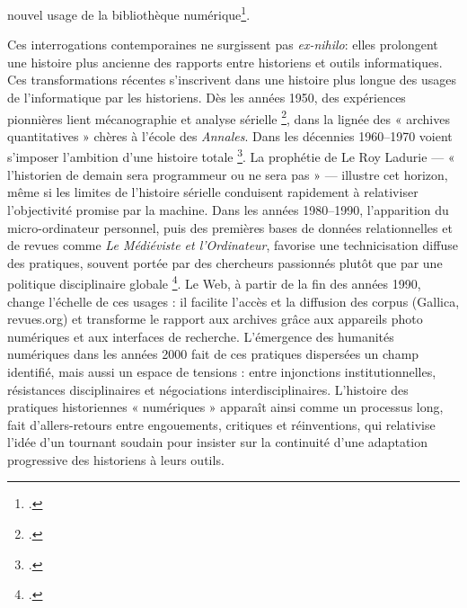 nouvel usage de la bibliothèque numérique\footcite[][]{bequet}.

Ces interrogations contemporaines ne surgissent pas \emph{ex-nihilo}: elles prolongent une histoire plus ancienne des rapports entre historiens et outils informatiques. Ces transformations récentes s’inscrivent dans une histoire plus longue des usages de l’informatique par les historiens. Dès les années 1950, des expériences pionnières lient mécanographie et analyse sérielle \footcite[][]{daumard}, dans la lignée des « archives quantitatives » chères à l’école des \emph{Annales}. Dans les décennies 1960–1970 voient s’imposer l’ambition d’une histoire totale \footcite[][]{poublanc}. La prophétie de Le Roy Ladurie — « l’historien de demain sera programmeur ou ne sera pas » — illustre cet horizon, même si les limites de l’histoire sérielle conduisent rapidement à relativiser l’objectivité promise par la machine. Dans les années 1980–1990, l’apparition du micro-ordinateur personnel, puis des premières bases de données relationnelles et de revues comme \emph{Le Médiéviste et l’Ordinateur}, favorise une technicisation diffuse des pratiques, souvent portée par des chercheurs passionnés plutôt que par une politique disciplinaire globale \footcite[][]{poublanc}. Le Web, à partir de la fin des années 1990, change l’échelle de ces usages : il facilite l’accès et la diffusion des corpus (Gallica, revues.org) et transforme le rapport aux archives grâce aux appareils photo numériques et aux interfaces de recherche. L’émergence des humanités numériques dans les années 2000 fait de ces pratiques dispersées un champ identifié, mais aussi un espace de tensions : entre injonctions institutionnelles, résistances disciplinaires et négociations interdisciplinaires. L’histoire des pratiques historiennes « numériques » apparaît ainsi comme un processus long, fait d’allers-retours entre engouements, critiques et réinventions, qui relativise l’idée d’un tournant soudain pour insister sur la continuité d’une adaptation progressive des historiens à leurs outils.

